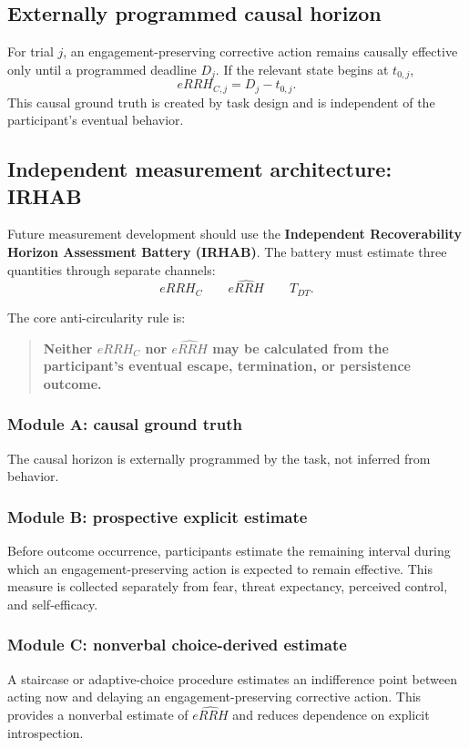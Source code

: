 \documentclass[11pt]{article}
\begin{document}
\subsection{Externally programmed causal horizon}
For trial $j$, an engagement-preserving corrective action remains causally effective only until a programmed deadline $D_j$. If the relevant state begins at $t_{0,j}$,
\[
eRRH_{C,j}=D_j-t_{0,j}.
\]
This causal ground truth is created by task design and is independent of the participant's eventual behavior.

\subsection{Independent measurement architecture: IRHAB}
Future measurement development should use the \textbf{Independent Recoverability Horizon Assessment Battery (IRHAB)}. The battery must estimate three quantities through separate channels:
\[
\boxed{eRRH_C}\qquad\boxed{\widehat{eRRH}}\qquad\boxed{T_{DT}}.
\]

The core anti-circularity rule is:
\begin{quote}
\textbf{Neither $eRRH_C$ nor $\widehat{eRRH}$ may be calculated from the participant's eventual escape, termination, or persistence outcome.}
\end{quote}

\subsubsection{Module A: causal ground truth}
The causal horizon is externally programmed by the task, not inferred from behavior.

\subsubsection{Module B: prospective explicit estimate}
Before outcome occurrence, participants estimate the remaining interval during which an engagement-preserving action is expected to remain effective. This measure is collected separately from fear, threat expectancy, perceived control, and self-efficacy.

\subsubsection{Module C: nonverbal choice-derived estimate}
A staircase or adaptive-choice procedure estimates an indifference point between acting now and delaying an engagement-preserving corrective action. This provides a nonverbal estimate of $\widehat{eRRH}$ and reduces dependence on explicit introspection.
\end{document}
